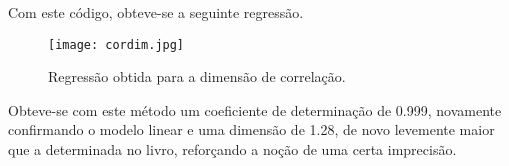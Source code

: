 \documentclass{article}[twocolumn]
\begin{document}
	Com este c\'odigo, obteve-se a seguinte regress\~ao.
	\begin{figure}[H]
		\centering
		\texttt{[image: cordim.jpg]}
		\caption{Regress\~ao obtida para a dimens\~ao de correla\c{c}\~ao.}
	\end{figure}
	Obteve-se com este m\'etodo um coeficiente de determina\c{c}\~ao de 0.999, novamente
	confirmando o modelo linear e uma dimens\~ao de 1.28, de novo levemente maior que a
	determinada no livro, refor\c{c}ando a no\c{c}\~ao de uma certa imprecis\~ao.
\end{document}

